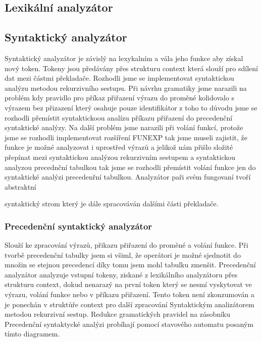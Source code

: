 \documentclass[a4paper, 11pt]{article}
\begin{document}
	\subsection{Lexikální analyzátor}
	\subsection{Syntaktický analyzátor}
    Syntaktický analyzátor je závislý na lexykalním a vála jeho funkce aby získal nový token. Tokeny
    jsou předávány přes strukturu context která slouží pro sdílení dat mezi částmi překladače.
    Rozhodli jsme se implementovat syntaktickou analýzu metodou rekurzivního sestupu. Při návrhu gramatiky
    jsme narazili na problém kdy pravidlo pro příkaz přiřazení výrazu do proměné kolidovalo s
    výrazem bez přizazení který osahuje pouze identifikátor z toho to důvodu jsme se rozhodli 
    přemístit syntaktickoou analízu příkazu přiřazení do precedenční syntaktické analýzy. 
    Na další problém jsme narazili při volání funkcí, protože jsme se rozhodli implementovat 
    rozšíření FUNEXP tak jsme museli zajistit, že funkce je možné analyzovat i uprostřed výrazů 
    a jelikož nám přišlo složité přepínat mezi syntaktickou analýzou rekurzivním sestupem a syntaktickou 
    analyzou precednční tabulkou tak jsme se rozhodli přemístit volání funkce jen do syntaktické analýzi precedenřní
    tabulkou. Analyzátor paři svém fungovaní tvoří abstraktní  syntaktický strom který je dále spracováván 
    dalšími části překladače.

	\subsubsection{Precedenční syntaktický analyzátor}
    Slouží ke zpracování výrazů, přikazu přiřazení do proměné a volání funkce. Při tvorbě precedenční tabulky jsem si 
    všiml, že operátori je možné sjednotit do množin se stejnou precedencí díky tomu jsem mohl tabulku zmenšit. Precedenční
    analyzátor analyzuje vstupní tokeny, ziskané z lexikálního analyzátoru přes strukturu context, dokud nenarazý na první
    token který se nesmí vyskytovat ve výrazu, volání funkce nebo v příkazu přiřazení. Tento token není zkonzumován a je 
    ponechán v struktůře context pro další zpracování Syntaktickým analizátorem metodou rekurzivní sestup. Redukce gramatických
    pravidel na zásobníku Precedenční syntaktycké analýzi probíhají pomocí stavového automatu posaným tímto diagramem. 
\end{document}
